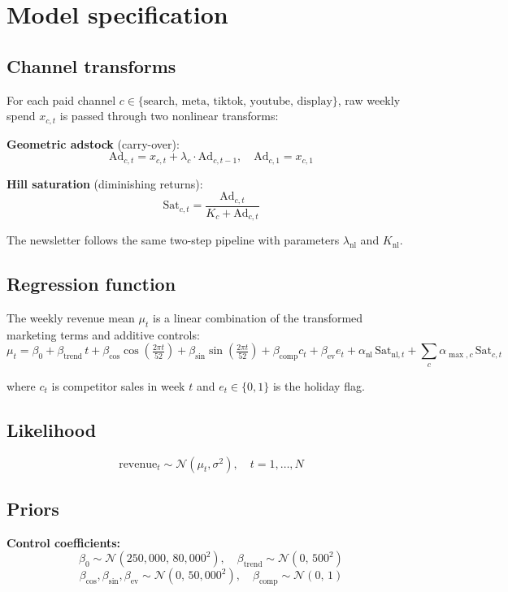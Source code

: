 \documentclass[a4paper,11pt]{article}
\begin{document}
\section{Model specification}

\subsection{Channel transforms}

For each paid channel $c \in \{\text{search, meta, tiktok, youtube, display}\}$, raw
weekly spend $x_{c,t}$ is passed through two nonlinear transforms:

\textbf{Geometric adstock} (carry-over):
$$\text{Ad}_{c,t} = x_{c,t} + \lambda_c \cdot \text{Ad}_{c,t-1}, \quad \text{Ad}_{c,1} = x_{c,1}$$

\textbf{Hill saturation} (diminishing returns):
$$\text{Sat}_{c,t} = \frac{\text{Ad}_{c,t}}{K_c + \text{Ad}_{c,t}}$$

The newsletter follows the same two-step pipeline with parameters
$\lambda_{\text{nl}}$ and $K_{\text{nl}}$.

\subsection{Regression function}

The weekly revenue mean $\mu_t$ is a linear combination of the
transformed marketing terms and additive controls:
$$\mu_t = \beta_0 + \beta_{\text{trend}} \, t + \beta_{\cos} \cos\!\left(\tfrac{2\pi t}{52}\right) + \beta_{\sin} \sin\!\left(\tfrac{2\pi t}{52}\right) + \beta_{\text{comp}} c_t + \beta_{\text{ev}} e_t + \alpha_{\text{nl}} \, \text{Sat}_{\text{nl}, t} + \sum_{c} \alpha_{\max, c} \, \text{Sat}_{c, t}$$

where $c_t$ is competitor sales in week $t$ and $e_t \in \{0, 1\}$ is
the holiday flag.

\subsection{Likelihood}

$$\text{revenue}_t \sim \mathcal{N}(\mu_t, \sigma^2), \quad t = 1, \ldots, N$$

\subsection{Priors}

\textbf{Control coefficients:}
$$\beta_0 \sim \mathcal{N}(250{,}000,\, 80{,}000^2), \quad \beta_{\text{trend}} \sim \mathcal{N}(0,\, 500^2)$$
$$\beta_{\cos}, \beta_{\sin}, \beta_{\text{ev}} \sim \mathcal{N}(0,\, 50{,}000^2), \quad \beta_{\text{comp}} \sim \mathcal{N}(0,\, 1)$$
\end{document}
